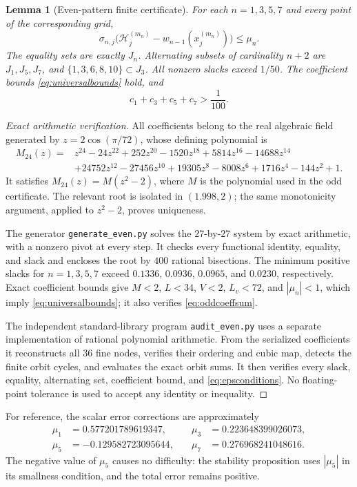 \documentclass[11pt]{article}
\newtheorem{lemma}[theorem]{Lemma}
\theoremstyle{remark}\newtheorem{remark}[theorem]{Remark}
\begin{document}
\begin{lemma}[Even-pattern finite certificate]\label{lem:evencertificate}
For each $n=1,3,5,7$ and every point of the corresponding grid,
\[
 \sigma_{n,j}\bigl(\mathcal H_j^{(m_n)}-w_{n-1}(x_j^{(m_n)})\bigr)
 \le\mu_n.
\]
The equality sets are exactly $J_n$. Alternating subsets of cardinality
$n+2$ are $J_1,J_5,J_7$, and
$\{1,3,6,8,10\}\subset J_3$. All nonzero slacks exceed $1/50$.
The coefficient bounds \eqref{eq:universalbounds} hold, and
\begin{equation}\label{eq:oddcoeffsum}
 c_1+c_3+c_5+c_7>\frac1{100}.
\end{equation}
\end{lemma}
\begin{proof}[Exact arithmetic verification]
All coefficients belong to the real algebraic field generated by
$z=2\cos(\pi/72)$, whose defining polynomial is
\begin{align*}
 M_{24}(z)={}&z^{24}-24z^{22}+252z^{20}-1520z^{18}+5814z^{16}
 -14688z^{14}\\
 &+24752z^{12}-27456z^{10}+19305z^8-8008z^6
 +1716z^4-144z^2+1.
\end{align*}
It satisfies $M_{24}(z)=M(z^2-2)$, where $M$ is the polynomial used in
the odd certificate. The relevant root is isolated in $(1.998,2)$;
the same monotonicity argument, applied to $z^2-2$, proves uniqueness.

The generator \texttt{generate\_even.py} solves the $27$-by-$27$ system
by exact arithmetic, with a nonzero pivot at every step. It checks every
functional identity, equality, and slack and encloses the root by $400$
rational bisections. The minimum positive slacks for $n=1,3,5,7$ exceed
$0.1336$, $0.0936$, $0.0965$, and $0.0230$, respectively. Exact coefficient
bounds give $M<2$, $L<34$, $V<2$, $L_v<72$, and $|\mu_n|<1$,
which imply \eqref{eq:universalbounds}; it also verifies
\eqref{eq:oddcoeffsum}.

The independent standard-library program \texttt{audit\_even.py} uses a
separate implementation of rational polynomial arithmetic. From the
serialized coefficients it reconstructs all $36$ fine nodes, verifies
their ordering and cubic map, detects the finite orbit cycles, and
evaluates the exact orbit sums. It then verifies every slack, equality,
alternating set, coefficient bound, and \eqref{eq:epsconditions}. No
floating-point tolerance is used to accept any identity or inequality.
\end{proof}

For reference, the scalar error corrections are approximately
\begin{align*}
 \mu_1&=0.577201789619347,&\quad \mu_3&=0.223648399026073,\\
 \mu_5&=-0.129582723095644,&\quad \mu_7&=0.276968241048616.
\end{align*}
The negative value of $\mu_5$ causes no difficulty: the stability
proposition uses $|\mu_5|$ in its smallness condition, and the total error
remains positive.
\end{document}
